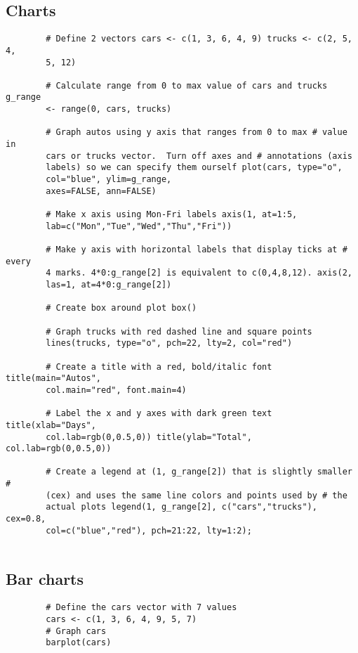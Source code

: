 \documentclass[a4paper,12pt]{article}
\begin{document}
\begin{itemize}
	
	\subsection{ Charts}
	
	\begin{framed}
		\begin{verbatim}
		# Define 2 vectors cars <- c(1, 3, 6, 4, 9) trucks <- c(2, 5, 4,
		5, 12)
		
		# Calculate range from 0 to max value of cars and trucks g_range
		<- range(0, cars, trucks)
		
		# Graph autos using y axis that ranges from 0 to max # value in
		cars or trucks vector.  Turn off axes and # annotations (axis
		labels) so we can specify them ourself plot(cars, type="o",
		col="blue", ylim=g_range,
		axes=FALSE, ann=FALSE)
		
		# Make x axis using Mon-Fri labels axis(1, at=1:5,
		lab=c("Mon","Tue","Wed","Thu","Fri"))
		
		# Make y axis with horizontal labels that display ticks at # every
		4 marks. 4*0:g_range[2] is equivalent to c(0,4,8,12). axis(2,
		las=1, at=4*0:g_range[2])
		
		# Create box around plot box()
		
		# Graph trucks with red dashed line and square points
		lines(trucks, type="o", pch=22, lty=2, col="red")
		
		# Create a title with a red, bold/italic font title(main="Autos",
		col.main="red", font.main=4)
		
		# Label the x and y axes with dark green text title(xlab="Days",
		col.lab=rgb(0,0.5,0)) title(ylab="Total", col.lab=rgb(0,0.5,0))
		
		# Create a legend at (1, g_range[2]) that is slightly smaller #
		(cex) and uses the same line colors and points used by # the
		actual plots legend(1, g_range[2], c("cars","trucks"), cex=0.8,
		col=c("blue","red"), pch=21:22, lty=1:2);
		
		\end{verbatim}
	\end{framed}
	\subsection{Bar charts}
	\begin{framed}
		\begin{verbatim}
		# Define the cars vector with 7 values
		cars <- c(1, 3, 6, 4, 9, 5, 7)
		# Graph cars
		barplot(cars)
		\end{verbatim}
	\end{framed}

\end{itemize}
\end{document}
